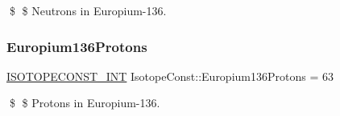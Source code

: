 \$ \$ Neutrons in Europium-\/136. \mbox{\label{group___isotope_const-_europium-_eu136_ga54b68756099e2d7e80f6c418ae9d8af0}} 
\subsubsection{\texorpdfstring{Europium136\+Protons}{Europium136Protons}}
{\footnotesize\ttfamily \mbox{\hyperlink{group___isotope_const-_macros_ga5f18360b3e99483a35c32d789e62621c}{I\+S\+O\+T\+O\+P\+E\+C\+O\+N\+S\+T\+\_\+\+I\+NT}} Isotope\+Const\+::\+Europium136\+Protons = 63}

\$ \$ Protons in Europium-\/136. 